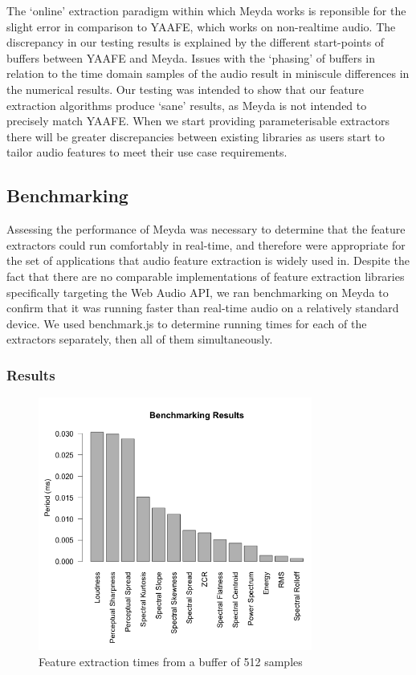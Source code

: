 \documentclass{sig-alternate}
\begin{document}
The `online' extraction paradigm within which Meyda works is reponsible for the slight error in comparison to YAAFE, which works on non-realtime audio. The discrepancy in our testing results is explained by the different start-points of buffers between YAAFE and Meyda. Issues with the `phasing' of buffers in relation to the time domain samples of the audio result in miniscule differences in the numerical results. Our testing was intended to show that our feature extraction algorithms produce `sane' results, as Meyda is not intended to precisely match YAAFE. When we start providing parameterisable extractors there will be greater discrepancies between existing libraries as users start to tailor audio features to meet their use case requirements.

\subsection{Benchmarking}
Assessing the performance of Meyda was necessary to determine that the feature extractors could run comfortably in real-time, and therefore were appropriate for the set of applications that audio feature extraction is widely used in. Despite the fact that there are no comparable implementations of feature extraction libraries specifically targeting the Web Audio API, we ran benchmarking on Meyda to confirm that it was running faster than real-time audio on a relatively standard device. We used benchmark.js to determine running times for each of the extractors separately, then all of them simultaneously.

\subsubsection{Results}

\begin{figure}[ht!]
\centering
\includegraphics[width=90mm]{512_samples.png}
\caption{Feature extraction times from a buffer of 512 samples}
\end{figure}
\end{document}
